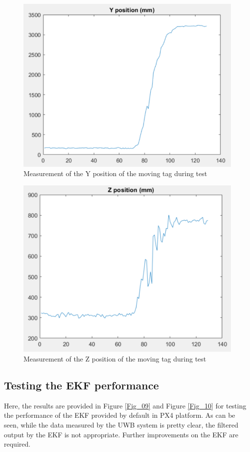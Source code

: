 \documentclass{article}
\begin{document}
\begin{figure}[thpb]
\centering
\includegraphics[scale=0.7]{Pics/Test_MovingTag_Y.PNG}
\caption{Measurement of the Y position of the moving tag during test}
\label{Fig_07}
\end{figure}

\begin{figure}[thpb]
\centering
\includegraphics[scale=0.9]{Pics/Test_MovingTag_Z.PNG}
\caption{Measurement of the Z position of the moving tag during test}
\label{Fig_08}
\end{figure}

\newpage
\subsection{Testing the EKF performance}
Here, the results are provided in Figure \ref{Fig_09} and Figure \ref{Fig_10} for testing the performance of the EKF provided by default in PX4 platform.
As can be seen, while the data measured by the UWB system is pretty clear, the filtered output by the EKF is not appropriate. Further improvements on the EKF are required.
\end{document}
